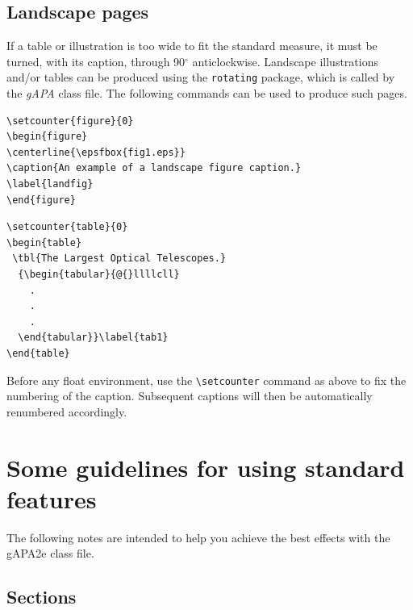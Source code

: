 \documentclass{gAPA2e}
\theoremstyle{plain}
\theoremstyle{remark}
\theoremstyle{definition}
\begin{document}
\subsection{Landscape pages}\label{eps}

If a table or illustration is too wide to fit the standard measure, it must be turned, with its
caption, through 90$^{\circ}$ anticlockwise. Landscape illustrations and/or tables can be produced
using the \verb"rotating" package, which is called by the \textit{gAPA} class file. The following
commands can be used to produce such pages.
%
\begin{verbatim}
\setcounter{figure}{0}
\begin{figure}
\centerline{\epsfbox{fig1.eps}}
\caption{An example of a landscape figure caption.}
\label{landfig}
\end{figure}
\end{verbatim}

\begin{verbatim}
\setcounter{table}{0}
\begin{table}
 \tbl{The Largest Optical Telescopes.}
  {\begin{tabular}{@{}llllcll}
    .
    .
    .
  \end{tabular}}\label{tab1}
\end{table}
\end{verbatim}
%
Before any float environment, use the \verb"\setcounter" command
as above to fix the numbering of the caption. Subsequent captions
will then be automatically renumbered accordingly.


\section{Some guidelines for using standard features}

The following notes are intended to help you achieve the best effects with the gAPA2e class file.


\subsection{Sections}
\end{document}
